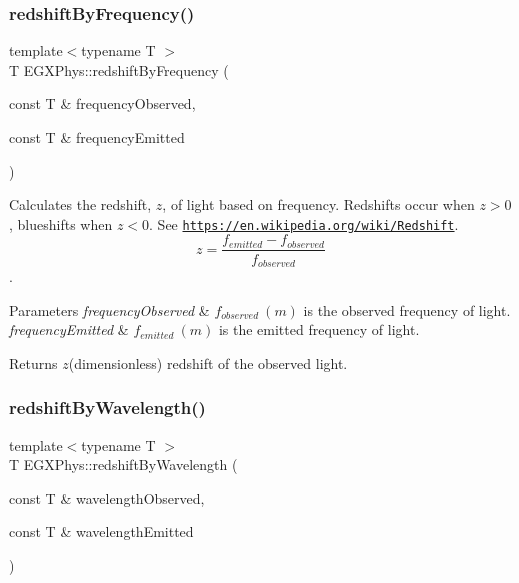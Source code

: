 \subsubsection{\texorpdfstring{redshift\+By\+Frequency()}{redshiftByFrequency()}}
{\footnotesize\ttfamily template$<$typename T $>$ \\
T E\+G\+X\+Phys\+::redshift\+By\+Frequency (\begin{DoxyParamCaption}\item[{const T \&}]{frequency\+Observed,  }\item[{const T \&}]{frequency\+Emitted }\end{DoxyParamCaption})}



Calculates the redshift, $z$, of light based on frequency. Redshifts occur when $z > 0$, blueshifts when $z < 0$. See \href{https://en.wikipedia.org/wiki/Redshift}{\tt https\+://en.\+wikipedia.\+org/wiki/\+Redshift}. \[z=\frac{f_{emitted}-f_{observed}}{f_{observed}}\]. 


\begin{DoxyParams}{Parameters}
{\em frequency\+Observed} & $f_{observed}\ (m)$ is the observed frequency of light. \\
\hline
{\em frequency\+Emitted} & $f_{emitted}\ (m)$ is the emitted frequency of light. \\
\hline
\end{DoxyParams}
\begin{DoxyReturn}{Returns}
$z$(dimensionless) redshift of the observed light. 
\end{DoxyReturn}
\mbox{\label{group___optics_ga29300a13e34da35332ca2d447b5ce82d}} 
\subsubsection{\texorpdfstring{redshift\+By\+Wavelength()}{redshiftByWavelength()}}
{\footnotesize\ttfamily template$<$typename T $>$ \\
T E\+G\+X\+Phys\+::redshift\+By\+Wavelength (\begin{DoxyParamCaption}\item[{const T \&}]{wavelength\+Observed,  }\item[{const T \&}]{wavelength\+Emitted }\end{DoxyParamCaption})}



